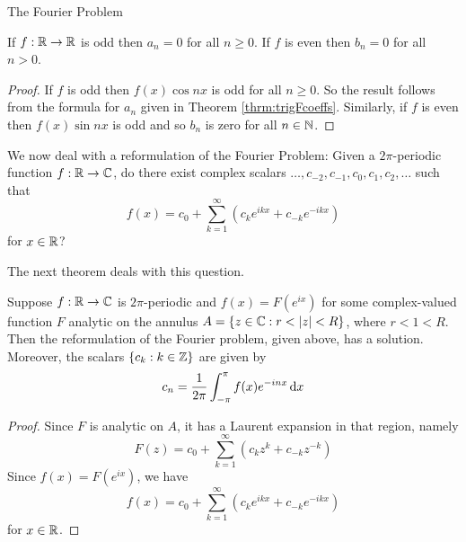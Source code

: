 \begin{section}{The Fourier Problem}
\begin{cor}\label{cor:EvenOdd}
	If $f:\real \to \real$ is odd then $a_n = 0$ for
	all $n \geq 0$. If $f$ is even then $b_n = 0$ for
	all $n > 0$.
\end{cor}

\begin{proof}
	If $f$ is odd then $f(x)\cos nx$ is odd for all
	$n \geq 0$. So the result follows from the formula
	for $a_n$ given in Theorem \ref{thrm:trigFcoeffs}.
	Similarly, if $f$ is even then $f(x)\sin nx$ is
	odd and so $b_n$ is zero for all $n \in \natrl$.
\end{proof}


We now deal with a reformulation of the
Fourier Problem: Given a $2\pi$-periodic function
$f:\real \to \cmplx$, do there exist complex scalars
$\ldots, c_{-2}, c_{-1}, c_0, c_1, c_2, \ldots$
such that
	\begin{displaymath}
		f(x) = c_0 + \sum_{k=1}^\infty
			(c_k e^{ikx} + c_{-k} e^{-ikx})
	\end{displaymath}
for $x \in \real$?

The next theorem deals with this question.

\begin{thrm}
	Suppose $f:\real \to \cmplx$ is $2\pi$-periodic and
	$f(x) = F(e^{ix})$ for some complex-valued function
	$F$ analytic on the annulus $A = \{z \in \cmplx:r <
	\modulus{z} < R\}$, where $r < 1 < R$. Then the
	reformulation of the Fourier problem, given above,
	has a solution. Moreover, the scalars $\{c_k:k \in
	\intgr\}$ are given by
		\begin{displaymath}
			c_n = \frac{1}{2\pi}
				\myintb[\pi]{f(x)e^{-inx}}{x}
		\end{displaymath}
\end{thrm}

\begin{proof}
	Since $F$ is analytic on $A$, it has a Laurent
	expansion in that region, namely
		\begin{displaymath}
			F(z) = c_0 + \sum_{k=1}^\infty
				(c_k z^k + c_{-k} z^{-k})
		\end{displaymath}
	Since $f(x) = F(e^{ix})$, we have
		\begin{displaymath}
			f(x) = c_0 + \sum_{k=1}^\infty
				(c_k e^{ikx} + c_{-k} e^{-ikx})
		\end{displaymath}
	for $x \in \real$.
	

\end{proof}
\end{section}
